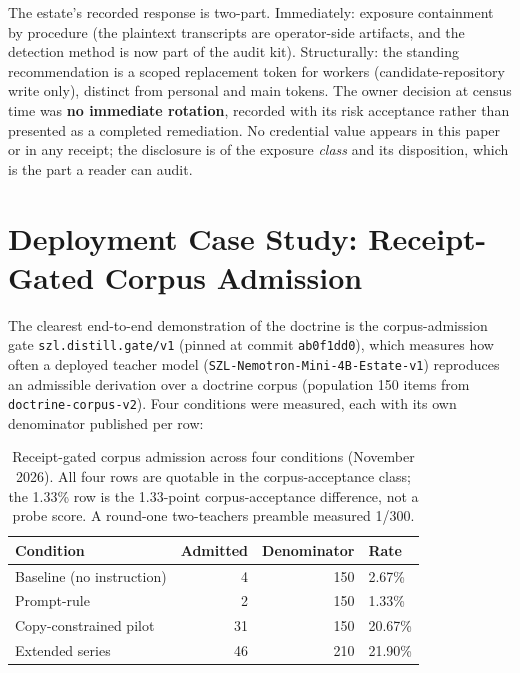 ﻿\documentclass[11pt]{article}
\begin{document}
The estate's recorded response is two-part. Immediately: exposure containment by procedure (the plaintext transcripts are operator-side artifacts, and the detection method is now part of the audit kit). Structurally: the standing recommendation is a scoped replacement token for workers (candidate-repository write only), distinct from personal and main tokens. The owner decision at census time was \textbf{no immediate rotation}, recorded with its risk acceptance rather than presented as a completed remediation. No credential value appears in this paper or in any receipt; the disclosure is of the exposure \emph{class} and its disposition, which is the part a reader can audit.

\section{Deployment Case Study: Receipt-Gated Corpus Admission}
\label{sec:deploy}

The clearest end-to-end demonstration of the doctrine is the corpus-admission gate \texttt{szl.distill.gate/v1} (pinned at commit \texttt{ab0f1dd0}), which measures how often a deployed teacher model (\texttt{SZL-Nemotron-Mini-4B-Estate-v1}) reproduces an admissible derivation over a doctrine corpus (population 150 items from \texttt{doctrine-corpus-v2}). Four conditions were measured, each with its own denominator published per row:

\begin{table}[htbp]
\centering
\small
\begin{tabular}{lrrl}
\toprule
\textbf{Condition} & \textbf{Admitted} & \textbf{Denominator} & \textbf{Rate} \\
\midrule
Baseline (no instruction) & 4 & 150 & 2.67\% \\
Prompt-rule & 2 & 150 & 1.33\% \\
Copy-constrained pilot & 31 & 150 & 20.67\% \\
Extended series & 46 & 210 & 21.90\% \\
\bottomrule
\end{tabular}
\caption{Receipt-gated corpus admission across four conditions (November 2026). All four rows are quotable in the corpus-acceptance class; the 1.33\% row is the 1.33-point corpus-acceptance difference, not a probe score. A round-one two-teachers preamble measured 1/300.}
\label{tab:gates}
\end{table}
\end{document}
